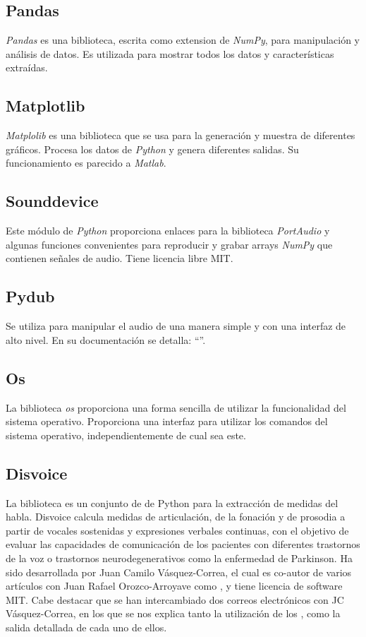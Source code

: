 \subsection{Pandas}
\textit{Pandas} \cite{tool:pandas} es una biblioteca, escrita como extension de \textit{NumPy}, para manipulación y análisis de datos. Es utilizada para mostrar todos los datos y características extraídas.

\subsection{Matplotlib}
\textit{Matplolib} \cite{tool:matplotlib} es una biblioteca que se usa para la generación y muestra de diferentes gráficos. Procesa los datos de \textit{Python} y genera diferentes salidas. Su funcionamiento es parecido a \textit{Matlab}.

\subsection{Sounddevice}
Este módulo de \textit{Python} proporciona enlaces para la biblioteca \textit{PortAudio} y algunas funciones convenientes para reproducir y grabar arrays \textit{NumPy} que contienen señales de audio. Tiene licencia libre MIT. \cite{pydoc:sounddevice}

\subsection{Pydub}
Se utiliza para manipular el audio de una manera simple y con una interfaz de alto nivel. En su documentación se detalla: ``''.

\subsection{Os}
La biblioteca \textit{os} proporciona una forma sencilla de utilizar la funcionalidad del sistema operativo. Proporciona una interfaz para utilizar los comandos del sistema operativo, independientemente de cual sea este.

\subsection{Disvoice}
La biblioteca   \cite{neurospeech} es un conjunto de  de Python para la extracción de medidas del habla. Disvoice calcula medidas de articulación, de la fonación y de prosodia a partir de vocales sostenidas y expresiones verbales continuas, con el objetivo de evaluar las capacidades de comunicación de los pacientes con diferentes trastornos de la voz o trastornos neurodegenerativos como la enfermedad de Parkinson. Ha sido desarrollada por Juan Camilo Vásquez-Correa, el cual es co-autor de varios artículos con Juan Rafael Orozco-Arroyave como \cite{neurospeech}, y tiene licencia de software MIT. Cabe destacar que se han intercambiado dos correos electrónicos con JC Vásquez-Correa, en los que se nos explica tanto la utilización de los , como la salida detallada de cada uno de ellos.

